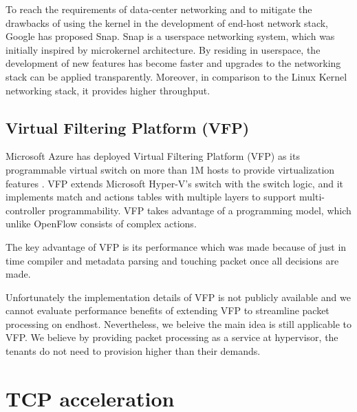To reach the requirements of data-center networking and to mitigate the drawbacks of using 
the kernel in the development of end-host network stack, Google has proposed Snap. Snap is 
a userspace networking system, which was initially inspired by microkernel architecture. 
By residing in userspace, the development of new features has become faster and upgrades to
the networking stack can be applied transparently. Moreover, in comparison to the Linux Kernel 
networking stack, it provides higher throughput.

\subsection{Virtual Filtering Platform (VFP)}
\label{vfp}

Microsoft Azure has deployed Virtual Filtering Platform (VFP) as its programmable 
virtual switch on more than 1M hosts to provide virtualization features 
\cite{firestone2017vfp}. VFP extends Microsoft Hyper-V's switch 
\cite{hyperv} with the switch logic, and it implements match and actions tables 
with multiple layers to support multi-controller programmability. VFP takes 
advantage of a programming model, which unlike OpenFlow consists of complex actions.

The key advantage of VFP is its performance which was made because of just in time compiler
and metadata parsing and touching packet once all decisions are made. 

Unfortunately the implementation details of VFP is not publicly available and we cannot 
evaluate performance benefits of extending VFP to streamline packet processing on endhost. 
Nevertheless,  we beleive the main idea is still applicable to VFP. 
We believe by providing packet processing as a service at 
hypervisor, the tenants do not need to provision higher than their demands.


\section{TCP acceleration}

